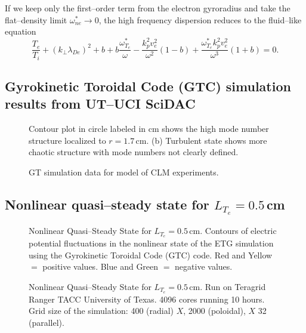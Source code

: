 \documentclass[a4paper,openany,12pt]{book}
\begin{document}
If we keep only the first--order term from the electron gyroradius and take the flat--density limit 
$\omega_{ne}^*\to 0$, the high frequency dispersion reduces to the fluid--like equation
$$\frac{T_e}{T_i}+(k_\perp\lambda_{De})^2+b+b\frac{\omega^*_{T_e}}{\omega}-\frac{k_p^2v_e^2}{\omega^2}(1-b)+\frac{\omega^*_{T_e}k_p^2v_e^2}{\omega^3}(1+b)=0.$$


\subsection{Gyrokinetic Toroidal Code (GTC) simulation results from UT--UCI SciDAC}
%
\begin{figure}[H]
\centerline{}
\caption{Contour plot in circle labeled in cm shows the high mode number structure localized to $r=1.7\,$cm. (b) Turbulent state shows more chaotic structure with mode numbers not clearly defined.}
\label{contour}
\end{figure}
%
\begin{figure}[H]
\centerline{}
\caption{GT simulation data for model of CLM experiments.}
\label{GT}
\end{figure}
%

\subsection{Nonlinear quasi--steady state for $L_{T_e}=0.5\,$cm}
%
\begin{figure}[H]
\centerline{}
\caption{Nonlinear Quasi--Steady State for $L_{T_e}=0.5\,$cm. Contours of electric potential fluctuations in the nonlinear state of the ETG simulation using the Gyrokinetic Toroidal Code (GTC) code. Red and Yellow $=$ positive values. Blue and Green $=$ negative values.}
\label{F9.17}
\end{figure}
%
%
\begin{figure}[H]
\centerline{}
\caption{Nonlinear Quasi--Steady State for $L_{T_e}=0.5\,$cm. Run on Teragrid Ranger TACC University of Texas. 4096 cores running 10 hours. Grid size of the simulation: 400 (radial) $X$, 2000 (poloidal), $X$ 32 (parallel).}
\label{F9.18}
\end{figure}
%
\end{document}

